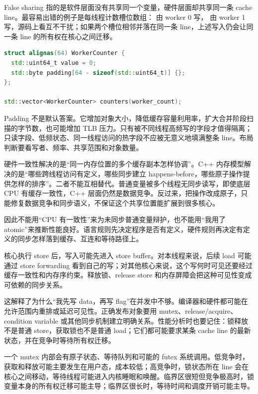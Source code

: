 False sharing 指的是软件层面没有共享同一个变量，硬件层面却共享同一条 cache line。最容易出错的例子是每线程计数槽位数组： 由 worker 0 写， 由 worker 1 写，源码上看互不干扰；如果两个槽位相邻并落在同一条 line，上述写入仍会让同一条 line 的所有权在核心之间迁移。

\begin{lstlisting}[language=C++,caption={按 cache line 隔离高频写槽位的形态}]
struct alignas(64) WorkerCounter {
  std::uint64_t value = 0;
  std::byte padding[64 - sizeof(std::uint64_t)] {};
};

std::vector<WorkerCounter> counters(worker_count);
\end{lstlisting}

Padding 不是默认答案。它增加对象大小，降低缓存容量利用率，扩大合并阶段扫描的字节数，也可能增加 TLB 压力。只有被不同线程高频写的字段才值得隔离；只读字段、低频状态、同一线程访问的热字段不应被无意义地填满整条 line。布局判断要看写者、频率、共享范围和对象数量。

硬件一致性解决的是“同一内存位置的多个缓存副本怎样协调”。C++ 内存模型解决的是“哪些跨线程访问有定义，哪些同步建立 happens-before，哪些原子操作提供怎样的排序”。二者不能互相替代。普通变量被多个线程无同步读写，即使底层 CPU 有缓存一致性，C++ 层面仍然是数据竞争。反过来，把操作改成原子，只能修复数据竞争和同步语义，不保证这个共享位置能扩展到很多核心。

因此不能用“CPU 有一致性”来为未同步普通变量辩护，也不能用“我用了 atomic”来推断性能良好。语言规则先决定程序是否有定义，硬件规则再决定有定义的同步怎样落到缓存、互连和等待路径上。

核心执行 store 后，写入可能先进入 store buffer。对本线程来说，后续 load 可能通过 store forwarding 看到自己的写；对其他核心来说，这个写何时可见还要经过缓存一致性和内存序约束。释放锁、release store 和内存屏障会把这种可见性变成可依赖的同步关系。

这解释了为什么“我先写 data，再写 flag”在并发中不够。编译器和硬件都可能在允许范围内重排或延迟可见性。正确发布对象要用 mutex、release/acquire、condition variable 或其他同步机制建立明确关系。性能分析时也要记住：锁释放不是普通 store，获取锁也不是普通 load；它们都可能要求某条 cache line 的最新状态，并在竞争时等待所有权迁移。

一个 mutex 内部会有原子状态、等待队列和可能的 futex 系统调用。低竞争时，获取和释放可能主要发生在用户态，成本较低；高竞争时，锁状态所在 line 会在核心之间移动，等待线程可能进入内核睡眠和唤醒。临界区很短但竞争极高时，锁变量本身的所有权迁移可能主导；临界区很长时，等待时间和调度开销可能主导。

